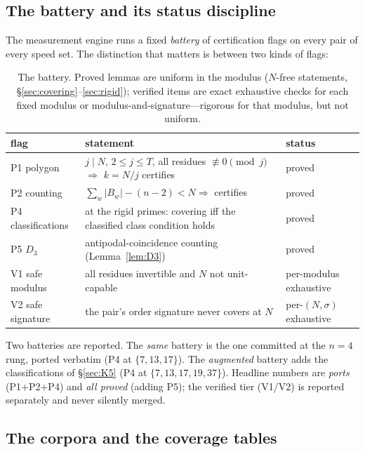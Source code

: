 \documentclass[11pt,a4paper]{article}
\numberwithin{equation}{section}
\theoremstyle{plain}
\theoremstyle{definition}
\theoremstyle{remark}
\begin{document}
\subsection{The battery and its status discipline}

The measurement engine runs a fixed \emph{battery} of certification
flags on every pair of every speed set. The distinction that matters is
between two kinds of flags:

\begin{table}[htbp]
\centering
\small
\caption{The battery. Proved lemmas are uniform in the modulus
($N$-free statements, \S\ref{sec:covering}--\ref{sec:rigid}); verified
items are exact exhaustive checks for each fixed modulus or
modulus-and-signature---rigorous for that modulus, but not uniform.}
\label{tab:battery}
\begin{tabularx}{\textwidth}{l X l}
\toprule
flag & statement & status \\
\midrule
P1 polygon & $j\mid N$, $2\le j\le T$, all residues $\not\equiv0 \pmod j$
  $\Rightarrow$ $k=N/j$ certifies & proved \\
P2 counting & $\sum_w|B_w|-(n-2)<N\Rightarrow$ certifies & proved \\
P4 classifications & at the rigid primes: covering iff the classified
  class condition holds & proved \\
P5 $D_3$ & antipodal-coincidence counting
  (Lemma~\ref{lem:D3}) & proved \\
V1 safe modulus & all residues invertible and $N$ not unit-capable &
  per-modulus exhaustive \\
V2 safe signature & the pair's order signature never covers at $N$ &
  per-$(N,\sigma)$ exhaustive \\
\bottomrule
\end{tabularx}
\end{table}

Two batteries are reported. The \emph{same} battery is the one committed
at the $n=4$ rung, ported verbatim (P4 at $\{7,13,17\}$). The
\emph{augmented} battery adds the classifications of
\S\ref{sec:K5} (P4 at $\{7,13,17,19,37\}$). Headline numbers are
\emph{ports} (P1$+$P2$+$P4) and \emph{all proved} (adding P5); the
verified tier (V1/V2) is reported separately and never silently merged.

\subsection{The corpora and the coverage tables}
\end{document}
